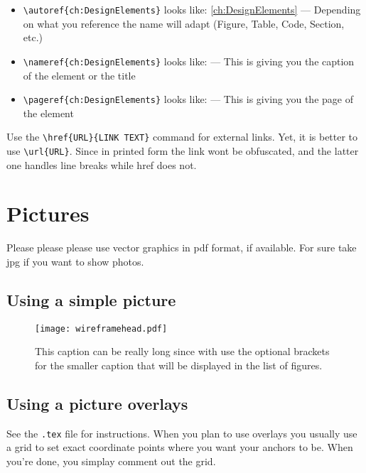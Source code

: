 \begin{itemize}
	\setlength\itemsep{-0.75em} %
	\item \verb|\autoref{ch:DesignElements}| looks like: \autoref{ch:DesignElements} --- Depending on what you reference the name will adapt (Figure, Table, Code, Section, etc.)
	\item \verb|\nameref{ch:DesignElements}| looks like:  --- This is giving you the caption of the element or the title
	\item \verb|\pageref{ch:DesignElements}| looks like: \pageref{ch:DesignElements} --- This is giving you the page of the element
\end{itemize}

Use the \verb|\href{URL}{LINK TEXT}| command for external links. Yet, it is better to use \verb|\url{URL}|. Since in printed form the link wont be obfuscated, and the latter one handles line breaks while href does not.

\section{Pictures}

Please please please use vector graphics in pdf format, if available. For sure take jpg if you want to show photos.

\subsection{Using a simple picture}

\begin{figure}[H]
\centering
\texttt{[image: wireframehead.pdf]}
	\caption[Optional shorter List of Figures Caption]{This caption can be really long since with use the optional brackets for the smaller caption that will be displayed in the list of figures.}
	\label{fig:WireframeHead}
\end{figure}


\subsection{Using a picture overlays}

See the \texttt{.tex} file for instructions. When you plan to use overlays you usually use a grid to set exact coordinate points where you want your anchors to be. When you’re done, you simplay comment out the grid.


